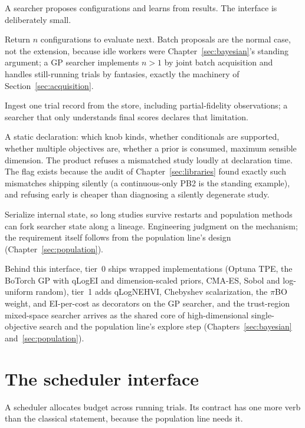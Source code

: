 A searcher proposes configurations and learns from results. The
interface is deliberately small.

\begin{description}[style=nextline, leftmargin=1.6em, itemsep=2pt]
\item[propose(n, state)] Return $n$ configurations to evaluate next.
Batch proposals are the normal case, not the extension, because idle
workers were Chapter~\ref{sec:bayesian}'s standing argument; a GP
searcher implements $n > 1$ by joint batch acquisition and handles
still-running trials by fantasies, exactly the machinery of
Section~\ref{sec:acquisition}.
\item[observe(record)] Ingest one trial record from the store,
including partial-fidelity observations; a searcher that only
understands final scores declares that limitation.
\item[capabilities] A static declaration: which knob kinds, whether
conditionals are supported, whether multiple objectives are, whether
a prior is consumed, maximum sensible dimension. The product refuses
a mismatched study loudly at declaration time. The flag exists
because the audit of Chapter~\ref{sec:libraries} found exactly such
mismatches shipping silently (a continuous-only PB2 is the standing
example), and refusing early is cheaper than diagnosing a silently
degenerate study.
\item[snapshot and restore] Serialize internal state, so long
studies survive restarts and population methods can fork searcher
state along a lineage. Engineering judgment on the mechanism; the
requirement itself follows from the population line's design
(Chapter~\ref{sec:population}).
\end{description}

Behind this interface, tier~0 ships wrapped implementations (Optuna
TPE, the BoTorch GP with qLogEI and dimension-scaled priors, CMA-ES,
Sobol and log-uniform random), tier~1 adds qLogNEHVI, Chebyshev
scalarization, the $\pi$BO weight, and EI-per-cost as decorators on
the GP searcher, and the trust-region mixed-space searcher arrives as
the shared core of high-dimensional single-objective search and the
population line's explore step (Chapters~\ref{sec:bayesian}
and~\ref{sec:population}).

\section{The scheduler interface}

A scheduler allocates budget across running trials. Its contract has
one more verb than the classical statement, because the population
line needs it.

